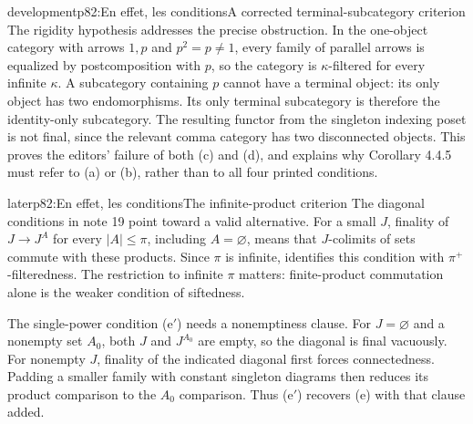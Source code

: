 \begin{dcomment}{development}{p82:En effet, les conditions}{A corrected terminal-subcategory criterion}
The rigidity hypothesis addresses the precise obstruction.  In the one-object category with arrows $1,p$ and $p^2=p\ne1$, every family of parallel arrows is equalized by postcomposition with $p$, so the category is $\kappa$-filtered for every infinite $\kappa$.  A subcategory containing $p$ cannot have a terminal object: its only object has two endomorphisms.  Its only terminal subcategory is therefore the identity-only subcategory.  The resulting functor from the singleton indexing poset is not final, since the relevant comma category has two disconnected objects.  This proves the editors' failure of both (c) and (d), and explains why Corollary 4.4.5 must refer to (a) or (b), rather than to all four printed conditions.
\end{dcomment}

\begin{dcomment}{later}{p82:En effet, les conditions}{The infinite-product criterion}
The diagonal conditions in note 19 point toward a valid alternative.  For a small $J$, finality of $J\to J^A$ for every $|A|\leq\pi$, including $A=\varnothing$, means that $J$-colimits of sets commute with these products.  Since $\pi$ is infinite, \citet[Theorem 3.1]{AdamekKoubekVelebil2000} identifies this condition with $\pi^+$-filteredness.  The restriction to infinite $\pi$ matters: finite-product commutation alone is the weaker condition of siftedness.

The single-power condition (e$'$) needs a nonemptiness clause.  For $J=\varnothing$ and a nonempty set $A_0$, both $J$ and $J^{A_0}$ are empty, so the diagonal is final vacuously.  For nonempty $J$, finality of the indicated diagonal first forces connectedness.  Padding a smaller family with constant singleton diagrams then reduces its product comparison to the $A_0$ comparison.  Thus (e$'$) recovers (e) with that clause added.
\end{dcomment}

